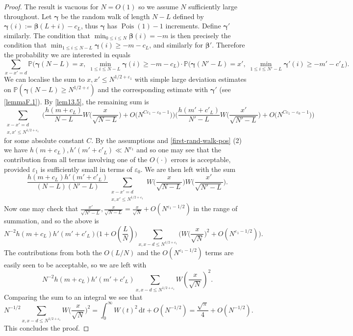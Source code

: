 \documentclass[11pt,reqno]{amsart}
\numberwithin{equation}{section}
\theoremstyle{definition}
\theoremstyle{remark}
\newcommand{\mb}{\mathbb}
\newcommand{\eps}{\varepsilon}
\newcommand\Pois{\operatorname{Pois}}
\def\boldbeta{\boldsymbol\beta}
\def\boldgamma{\boldsymbol\gamma}
\renewcommand{\le}{\leqslant}
\renewcommand{\ge}{\geqslant}
\begin{document}
\begin{proof} The result is vacuous for $N = O(1)$ so we assume $N$ sufficiently large throughout. 
Let $\boldgamma$ be the random walk of length $N- L$ defined by $\boldgamma(i) := \boldbeta(L+i) - c_L$, thus $\boldgamma$ has $\Pois(1) - 1$ increments. Define $\boldgamma'$ similarly. The condition that $\min_{0 \le i \le N} \boldbeta(i) = -m$ is then precisely the condition that $\min_{1 \le i \le N-L} \boldgamma(i) \ge -m-c_L$, and similarly for $\boldbeta'$.
Therefore the probability we are interested in equals
\[  \sum_{x - x'= d} \mb{P} \big( \boldgamma(N - L) = x,\; \min_{1 \le i \le N - L} \boldgamma(i) \ge  -m - c_L \big) \cdot \mb{P} \big( \boldgamma(N' - L) = x', \;\min_{1 \le i \le N' - L} \boldgamma'(i) \ge -m' - c'_L \big) . \]
We can localise the sum to $x, x' \le N^{1/2 + \eps_1}$ with simple large deviation estimates on $\mb{P}(\boldgamma(N - L) \ge N^{1/2 + \eps})$ and the corresponding estimate with $\boldgamma'$ (see \cref{lemmaF.1}).
By \cref{lem13.5}, the remaining sum is
\[ \sum_{\substack{x - x'= d \\ x, x' \le N^{1/2 + \eps_1}}} \!\!\!\!\!\!\Big( \frac{h(m + c_L)}{N - L} W\big(\frac{x}{\sqrt{N - L}}\big) + O\big(  N^{C\eps_1 - \eps_0 - 1}\big)\Big)\Big( \frac{h(m' + c'_L)}{N' - L} W\big(\frac{x'}{\sqrt{N' - L}}\big) + O\big(  N^{C\eps_1 - \eps_0 - 1}\big)\Big) \] for some absolute constant $C$. 
By the assumptions and \cref{first-rand-walk-pos} (2) we have $h(m + c_L), h'(m' + c'_L) \ll N^{\eps_1}$ and so one may see that the contribution from all terms involving one of the $O(\cdot)$ errors is acceptable, provided $\eps_1$ is sufficiently small in terms of $\eps_0$. We are then left with the sum
\begin{equation*}\frac{h(m + c_L) h'(m' + c'_L)}{(N - L)(N' - L)}  \sum_{\substack{x - x'= d \\ x, x' \le N^{1/2 + \eps_1}}} W\big(\frac{x}{\sqrt{N - L}}\big) W\big(\frac{x'}{\sqrt{N' - L}}\big) . \end{equation*}
Now one may check that $\frac{x'}{\sqrt{N' - L}}, \frac{x}{\sqrt{N - L}} = \frac{x}{\sqrt{N}} + O(N^{\eps_1 - 1/2})$ in the range of summation, and so the above is
\[ N^{-2} h(m + c_L) h'(m' + c'_L)\big(1 + O(\frac{L}{N})\big) \sum_{x, x - d \le N^{1/2 + \eps_1}} \Big( W\big(\frac{x}{\sqrt{N}}\big)^2 + O(N^{\eps_1 - 1/2})\Big). \] The contributions from both the $O(L/N)$ and the $O(N^{\eps_1 - 1/2})$ terms are easily seen to be acceptable, so we are left with
\[ N^{-2} h(m + c_L) h'(m' + c'_L) \sum_{x, x - d \le N^{1/2 + \eps_1}}  W(\frac{x}{\sqrt{N}})^2. \] Comparing the sum to an integral we see that 
\[ N^{-1/2}  \sum_{x, x - d \le N^{1/2 + \eps_1}} W\big(\frac{x}{\sqrt{N}}\big)^2 = \int^{\infty}_0 W(t)^2 \, \mathrm{d}t + O(N^{-1/2}) = \frac{\sqrt{\pi}}{4} + O(N^{-1/2}).\]
This concludes the proof.
\end{proof}
\end{document}
